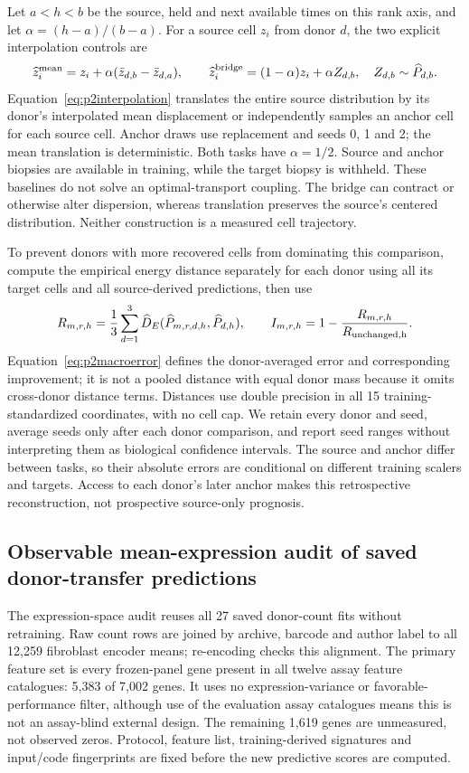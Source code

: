 Let $a<h<b$ be the source, held and next available times on this rank axis, and let $\alpha=(h-a)/(b-a)$. For a source cell $z_i$ from donor $d$, the two explicit interpolation controls are
\begin{equation}
\widehat z_i^{\rm mean}=z_i+\alpha(\bar z_{d,b}-\bar z_{d,a}),\qquad
\widehat z_i^{\rm bridge}=(1-\alpha)z_i+\alpha Z_{d,b},\quad
Z_{d,b}\sim\widehat P_{d,b}.\label{eq:p2interpolation}
\end{equation}
Equation~\eqref{eq:p2interpolation} translates the entire source distribution by its donor's interpolated mean displacement or independently samples an anchor cell for each source cell. Anchor draws use replacement and seeds 0, 1 and 2; the mean translation is deterministic. Both tasks have $\alpha=1/2$. Source and anchor biopsies are available in training, while the target biopsy is withheld. These baselines do not solve an optimal-transport coupling. The bridge can contract or otherwise alter dispersion, whereas translation preserves the source's centered distribution. Neither construction is a measured cell trajectory.

To prevent donors with more recovered cells from dominating this comparison, compute the empirical energy distance separately for each donor using all its target cells and all source-derived predictions, then use
\begin{equation}
R_{m,r,h}=\frac13\sum_{d=1}^{3}\widehat D_E(\widehat P_{m,r,d,h},\widehat P_{d,h}),\qquad
I_{m,r,h}=1-\frac{R_{m,r,h}}{R_{\rm unchanged,h}}.\label{eq:p2macroerror}
\end{equation}
Equation~\eqref{eq:p2macroerror} defines the donor-averaged error and corresponding improvement; it is not a pooled distance with equal donor mass because it omits cross-donor distance terms. Distances use double precision in all 15 training-standardized coordinates, with no cell cap. We retain every donor and seed, average seeds only after each donor comparison, and report seed ranges without interpreting them as biological confidence intervals. The source and anchor differ between tasks, so their absolute errors are conditional on different training scalers and targets. Access to each donor's later anchor makes this retrospective reconstruction, not prospective source-only prognosis.

\subsection{Observable mean-expression audit of saved donor-transfer predictions}
The expression-space audit reuses all 27 saved donor-count fits without retraining. Raw count rows are joined by archive, barcode and author label to all 12,259 fibroblast encoder means; re-encoding checks this alignment. The primary feature set is every frozen-panel gene present in all twelve assay feature catalogues: 5,383 of 7,002 genes. It uses no expression-variance or favorable-performance filter, although use of the evaluation assay catalogues means this is not an assay-blind external design. The remaining 1,619 genes are unmeasured, not observed zeros. Protocol, feature list, training-derived signatures and input/code fingerprints are fixed before the new predictive scores are computed.

